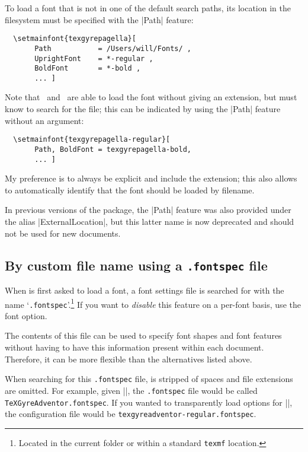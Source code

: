 \documentclass[a4paper]{l3doc}
\begin{document}
To load a font that is not in one of the default search paths, its location
in the filesystem must be specified with the |Path| feature:
\begin{Verbatim}
  \setmainfont{texgyrepagella}[
       Path           = /Users/will/Fonts/ ,
       UprightFont    = *-regular ,
       BoldFont       = *-bold ,
       ... ]
\end{Verbatim}
Note that \XeTeX\ and \LuaTeX\ are able to load the font without giving an
extension, but  must know to search for the file; this can be
indicated by using the |Path| feature without an argument:
\begin{Verbatim}
  \setmainfont{texgyrepagella-regular}[
       Path, BoldFont = texgyrepagella-bold,
       ... ]
\end{Verbatim}
My preference is to always be explicit and include the extension; this also allows  to automatically identify that the font should be loaded by filename.

In previous versions of the package, the |Path| feature was also provided under the alias |ExternalLocation|, but this latter name is now deprecated and should not be used for new documents.


\subsection{By custom file name using a \texttt{.fontspec} file}
\label{sec:fontspecfile}

When  is first asked to load a font, a font settings file is searched
for with the name `\texttt{.fontspec}'.\footnote{Located in the current folder or within a standard \texttt{texmf} location.}
If you want to \emph{disable} this feature on a per-font basis, use the  font option.

The contents of this file can be used to specify font shapes and font features without having to have this information present within each document.
Therefore, it can be more flexible than the alternatives listed above.

When searching for this \texttt{.fontspec} file,  is stripped of spaces and file extensions are omitted.
For example, given |\setmainfont{TeX Gyre Adventor}|, the \texttt{.fontspec} file would be
called \texttt{TeXGyreAdventor.fontspec}.
If you wanted to transparently load options for |\setmainfont{texgyreadventor-regular.otf}|, the configuration
file would be \texttt{texgyreadventor-regular.fontspec}.
\end{document}
